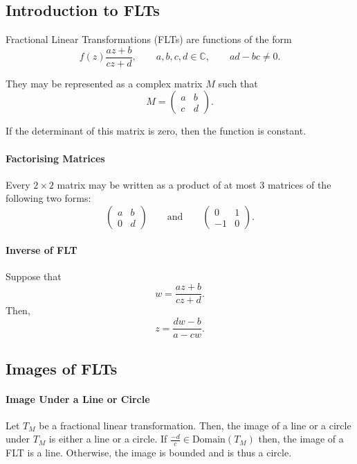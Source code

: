 \documentclass[12pt, letterpaper]{article}
\begin{document}
    \subsection{Introduction to FLTs}
    
    Fractional Linear Transformations (FLTs) are functions of the form
    \[f(z) \frac{az+b}{cz+d}, \quad\quad a,b,c,d\in\mathbb{C}, \quad\quad ad-bc\neq 0.\]

    They may be represented as a complex matrix \(M\) such that 
    \[M = \begin{pmatrix} a & b \\ c & d \end{pmatrix}.\]

    If the determinant of this matrix is zero, then the function is constant.

    \paragraph{Factorising Matrices} Every \(2\times 2\) matrix may be written as a product of at most \(3\) matrices of the following two forms:
    \[
        \begin{pmatrix}
            a & b \\ 0 & d
        \end{pmatrix} 
        \quad\quad \text{and} \quad \quad
        \begin{pmatrix}
            0 & 1 \\ -1 & 0
        \end{pmatrix}.
    \]
    
    \paragraph{Inverse of FLT}
    Suppose that \[ w = \frac{az + b}{cz + d}.\]
    Then, \[ z = \frac{dw - b}{a-cw}.\]
    
    \subsection{Images of FLTs}
    \paragraph{Image Under a Line or Circle}
    Let \(T_M\) be a fractional linear transformation. Then, the image of a line or a circle under \(T_M\) is either a line or a circle.
    If \(\frac{-d}{c}\in \text{Domain}(T_M)\) then, the image of a FLT is a line.
    Otherwise, the image is bounded and is thus a circle.
    
\end{document}
